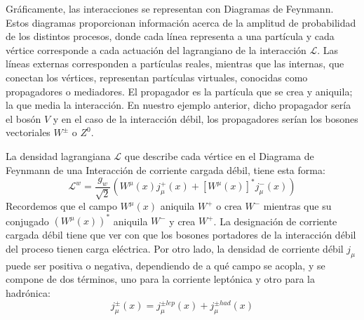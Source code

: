 Gráficamente, las interacciones se representan con Diagramas de Feynmann. Estos diagramas proporcionan información acerca de la amplitud de probabilidad de los distintos procesos, donde cada línea representa a una partícula y cada vértice corresponde a cada actuación del lagrangiano de la interacción $\mathcal{L}$. Las líneas externas corresponden a partículas reales, mientras que las internas, que conectan los vértices, representan partículas virtuales, conocidas como propagadores o mediadores. El propagador es la partícula que se crea y aniquila; la que media la interacción. \cite{notas2020} En nuestro ejemplo anterior, dicho propagador sería el bosón $V$  y en el caso de la interacción débil, los propagadores serían los bosones vectoriales $W^{\pm}$ o $Z^0$.

La densidad lagrangiana $\mathcal{L}$ que describe cada vértice en el Diagrama de Feynmann de una Interacción de corriente cargada débil, tiene esta forma:
\begin{equation}
\mathcal{L}^{w}=\dfrac{g_{w}}{\sqrt{2}}\left( W^{\mu }\left( x\right) j_{\mu}^{+}\left( x\right) +\left[ W^{\mu }\left( x\right) \right]^{\ast }j_{\mu}^{-}\left( x\right) \right)\label{eq:weak_lagrangian}
\end{equation}
Recordemos que el campo $W^{\mu}(x)$ aniquila $W^{+}$ o crea $W^{-}$ mientras que su conjugado $\left(W^{\mu}(x)\right)^\ast$ aniquila $W^{-}$ y crea $W^{+}$. La designación de corriente cargada débil tiene que ver con que los bosones portadores de la interacción débil del proceso tienen carga eléctrica. Por otro lado, la densidad de corriente débil $j_{\mu}$ puede ser positiva o negativa, dependiendo de a qué campo se acopla, y se compone de dos términos, uno para la corriente leptónica y otro para la hadrónica:
\begin{equation}
j_{\mu} ^{\pm }\left( x\right) =j_{\mu} ^{\pm lep}\left( x\right) +j_{\mu} ^{\pm had}\left( x\right) \label{eq:weak_current_hadylep}
\end{equation}

